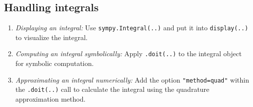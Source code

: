 \subsection{Handling integrals}\label{subsec:handling_integrals}

\begin{enumerate}
    \item \emph{Displaying an integral:}
    Use \texttt{sympy.Integral(..)}
    and put it into \texttt{display(..)} to visualize the integral.
    \item \emph{Computing an integral symbolically:}
    Apply \texttt{.doit(..)} to the integral object for symbolic computation.
    \item \emph{Approximating an integral numerically:}
    Add the option \texttt{"method=quad"} within the \texttt{.doit(..)} call
    to calculate the integral using the quadrature approximation method.
\end{enumerate}